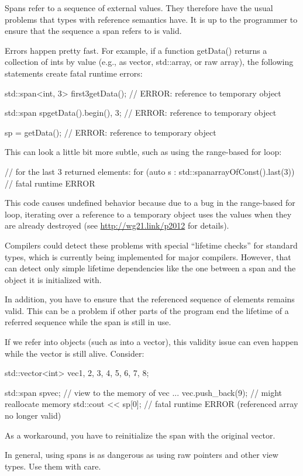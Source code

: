 Spans refer to a sequence of external values. They therefore have the usual problems that types with reference semantics have. It is up to the programmer to ensure that the sequence a span refers to is valid.

Errors happen pretty fast. For example, if a function getData() returns a collection of ints by value (e.g., as vector, std::array, or raw array), the following statements create fatal runtime errors:

\begin{cpp}
std::span<int, 3> first3{getData()}; // ERROR: reference to temporary object

std::span sp{getData().begin(), 3}; // ERROR: reference to temporary object

sp = getData(); // ERROR: reference to temporary object
\end{cpp}

This can look a little bit more subtle, such as using the range-based for loop:

\begin{cpp}
// for the last 3 returned elements:
for (auto s : std::span{arrayOfConst()}.last(3)) // fatal runtime ERROR
\end{cpp}

This code causes undefined behavior because due to a bug in the range-based for loop, iterating over a reference to a temporary object uses the values when they are already destroyed (see \url{http://wg21.link/p2012} for details).

Compilers could detect these problems with special “lifetime checks” for standard types, which is currently being implemented for major compilers. However, that can detect only simple lifetime dependencies like the one between a span and the object it is initialized with.

In addition, you have to ensure that the referenced sequence of elements remains valid. This can be a problem if other parts of the program end the lifetime of a referred sequence while the span is still in use.

If we refer into objects (such as into a vector), this validity issue can even happen while the vector is still alive. Consider:

\begin{cpp}
std::vector<int> vec{1, 2, 3, 4, 5, 6, 7, 8};

std::span sp{vec}; // view to the memory of vec
...
vec.push_back(9); // might reallocate memory
std::cout << sp[0]; // fatal runtime ERROR (referenced array no longer valid)
\end{cpp}

As a workaround, you have to reinitialize the span with the original vector.

In general, using spans is as dangerous as using raw pointers and other view types. Use them with care.


































